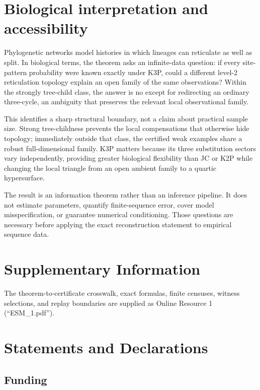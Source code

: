 \documentclass[11pt]{article}
\providecommand{\KThreePSubmissionRoot}{submission}
\begin{document}


\section{Biological interpretation and accessibility}

Phylogenetic networks model histories in which lineages can reticulate as
well as split. In biological terms, the theorem asks an infinite-data
question: if every site-pattern probability were known exactly under K3P,
could a different level-2 reticulation topology explain an open family of the
same observations? Within the strongly tree-child class, the answer is no
except for redirecting an ordinary three-cycle, an ambiguity that preserves
the relevant local observational family.

This identifies a sharp structural boundary, not a claim about practical
sample size. Strong tree-childness prevents the local compensations that
otherwise hide topology; immediately outside that class, the certified weak
examples share a robust full-dimensional family. K3P matters because its
three substitution sectors vary independently, providing greater biological
flexibility than JC or K2P while changing the local triangle from an open
ambient family to a quartic hypersurface.

The result is an information theorem rather than an inference pipeline. It
does not estimate parameters, quantify finite-sequence error, cover model
misspecification, or guarantee numerical conditioning. Those questions are
necessary before applying the exact reconstruction statement to empirical
sequence data.

\section*{Supplementary Information}

The theorem-to-certificate crosswalk, exact formulas, finite censuses, witness
selections, and replay boundaries are supplied as Online Resource 1
(``ESM\_1.pdf'').

\section*{Statements and Declarations}

\subsection*{Funding}
\texttt{}
\end{document}

